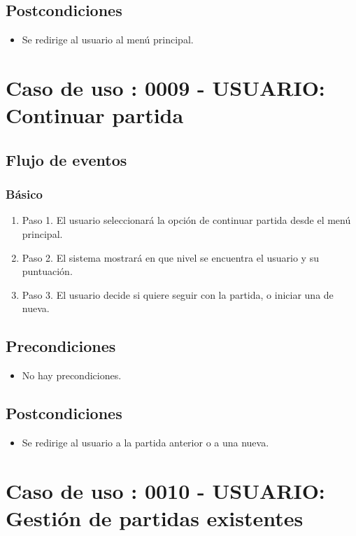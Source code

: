 \subsection{Postcondiciones}
\begin{itemize}
\item Se redirige al usuario al menú principal.
\end{itemize}



\section{Caso de uso : 0009 - USUARIO: Continuar partida}\label{sec:uc0}
\subsection{Flujo de eventos}
\subsubsection{Básico}

\begin{enumerate}
\item Paso 1.
El usuario seleccionará la opción de continuar partida desde el menú principal.
\item Paso 2.
El sistema mostrará en que nivel se encuentra el usuario y su puntuación.
\item Paso 3.
El usuario decide si quiere seguir con la partida, o iniciar una de nueva.
\end{enumerate}

\subsection{Precondiciones}
\begin{itemize}
\item No hay precondiciones.
\end{itemize}

\subsection{Postcondiciones}
\begin{itemize}
\item Se redirige al usuario a la partida anterior o a una nueva.
\end{itemize}



\section{Caso de uso : 0010 - USUARIO: Gestión de partidas existentes}\label{sec:uc0}
